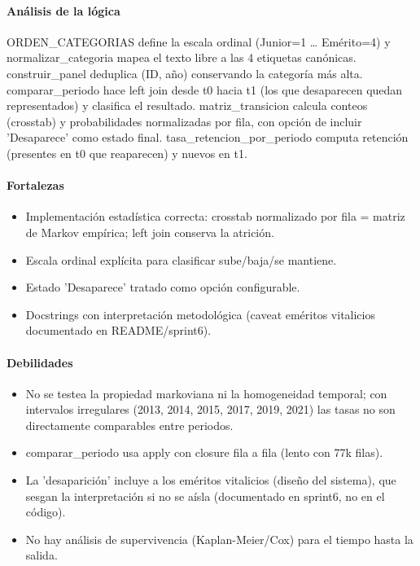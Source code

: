 \paragraph{Análisis de la lógica}
ORDEN\_CATEGORIAS define la escala ordinal (Junior=1 \dots{} Emérito=4) y normalizar\_categoria mapea el texto libre a las 4 etiquetas canónicas. construir\_panel deduplica (ID, año) conservando la categoría más alta. comparar\_periodo hace left join desde t0 hacia t1 (los que desaparecen quedan representados) y clasifica el resultado. matriz\_transicion calcula conteos (crosstab) y probabilidades normalizadas por fila, con opción de incluir 'Desaparece' como estado final. tasa\_retencion\_por\_periodo computa retención (presentes en t0 que reaparecen) y nuevos en t1.

\paragraph{Fortalezas}
\begin{itemize}
  \item Implementación estadística correcta: crosstab normalizado por fila = matriz de Markov empírica; left join conserva la atrición.
  \item Escala ordinal explícita para clasificar sube/baja/se mantiene.
  \item Estado 'Desaparece' tratado como opción configurable.
  \item Docstrings con interpretación metodológica (caveat eméritos vitalicios documentado en README/sprint6).
\end{itemize}

\paragraph{Debilidades}
\begin{itemize}
  \item No se testea la propiedad markoviana ni la homogeneidad temporal; con intervalos irregulares (2013, 2014, 2015, 2017, 2019, 2021) las tasas no son directamente comparables entre periodos.
  \item comparar\_periodo usa apply con closure fila a fila (lento con 77k filas).
  \item La 'desaparición' incluye a los eméritos vitalicios (diseño del sistema), que sesgan la interpretación si no se aísla (documentado en sprint6, no en el código).
  \item No hay análisis de supervivencia (Kaplan-Meier/Cox) para el tiempo hasta la salida.
\end{itemize}

